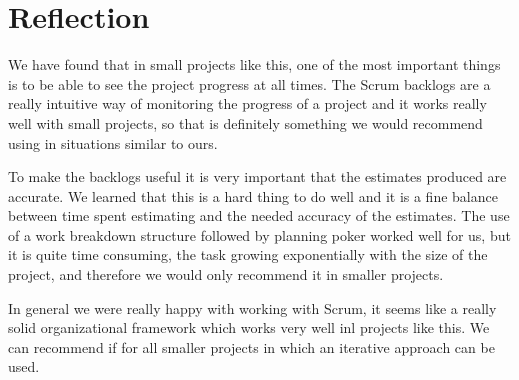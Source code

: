 \section{Reflection}

We have found that in small projects like this, one of the most important
things is to be able to see the project progress at all times. The Scrum
backlogs are a really intuitive way of monitoring the progress of a project and
it works really well with small projects, so that is definitely something we
would recommend using in situations similar to ours.

To make the backlogs useful it is very important that the estimates produced
are accurate. We learned that this is a hard thing to do well and it is a fine
balance between time spent estimating and the needed accuracy of the estimates.
The use of a work breakdown structure followed by planning poker worked well for
us, but it is quite time consuming, the task growing exponentially with the
size of the project, and therefore we would only recommend it in smaller
projects.

In general we were really happy with working with Scrum, it seems like a really
solid organizational framework which works very well inl projects like this. We
can recommend if for all smaller projects in which an iterative approach can be
used. 
